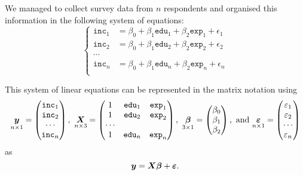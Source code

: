 We managed to collect survey data from $n$ respondents and organised this information in the following system of equations:
\begin{equation}
  \left\{
    \begin{aligned}
      \texttt{inc}_1 &= \beta_0+\beta_1\texttt{edu}_1+\beta_2\texttt{exp}_1+\epsilon_1\\
      \texttt{inc}_2 &= \beta_0+\beta_1\texttt{edu}_2+\beta_2\texttt{exp}_2+\epsilon_2\\
      \cdots\\
      \texttt{inc}_n &= \beta_0+\beta_1\texttt{edu}_n+\beta_2\texttt{exp}_n+\epsilon_n\\
    \end{aligned}
  \right.
\end{equation}

This system of linear equations can be represented in the matrix notation using
\begin{equation}
  \md{y}{n}{1}=
    \begin{pmatrix}
      \texttt{inc}_1\\
      \texttt{inc}_2\\
      \cdots\\
      \texttt{inc}_n\\
    \end{pmatrix},\ %
  \md{X}{n}{3}=
    \begin{pmatrix}
      1     &\texttt{edu}_1     &\texttt{exp}_1\\
      1     &\texttt{edu}_2     &\texttt{exp}_2\\
      \cdots\\
      1     &\texttt{edu}_n     &\texttt{exp}_n\\
    \end{pmatrix},\ %
  \md{\beta}{3}{1}=
    \begin{pmatrix}
      \beta_0\\
      \beta_1\\
      \beta_2\\
    \end{pmatrix},\ \text{and}\ %
  \md{\epsilon}{n}{1}=
    \begin{pmatrix}
      \epsilon_1\\
      \epsilon_2\\
      \cdots\\
      \epsilon_n\\
    \end{pmatrix}
  \end{equation}
as
\begin{equation}\label{Eq.setup}
  \m{y}=\m{X\beta}+\m{\epsilon}.
\end{equation}


